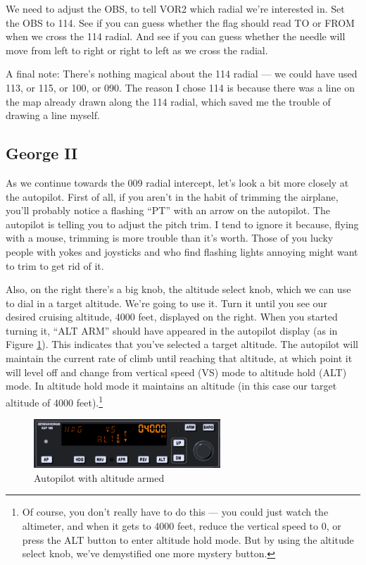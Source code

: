 We need to adjust the OBS, to tell VOR2 which radial we're interested
in.  Set the OBS to 114.  See if you can guess whether the flag should
read TO or FROM when we cross the 114 radial.  And see if you can
guess whether the needle will move from left to right or right to left
as we cross the radial.

A final note: There's nothing magical about the 114 radial --- we
could have used 113, or 115, or 100, or 090.  The reason I chose 114
is because there was a line on the map already drawn along the 114
radial, which saved me the trouble of drawing a line myself.

\subsection{George II}

As we continue towards the 009 radial intercept, let's look a bit more
closely at the autopilot.  First of all, if you aren't in the habit of
trimming the airplane, you'll probably notice a flashing ``PT'' with
an arrow on the autopilot.  The autopilot is telling you to adjust the
pitch trim.  I tend to ignore it because, flying with a mouse,
trimming is more trouble than it's worth.  Those of you lucky people
with yokes and joysticks and who find flashing lights annoying might
want to trim to get rid of it.

Also, on the right there's a big knob, the altitude select knob, which
we can use to dial in a target altitude.  We're going to use it.  Turn
it until you see our desired cruising altitude, 4000 feet, displayed
on the right.  When you started turning it, ``ALT ARM'' should have
appeared in the autopilot display (as in Figure \ref{fig:ap_alt}).
This indicates that you've selected a target altitude.  The autopilot
will maintain the current rate of climb until reaching that altitude,
at which point it will level off and change from vertical speed (VS)
mode to altitude hold (ALT) mode.  In altitude hold mode it maintains
an altitude (in this case our target altitude of 4000 feet).\footnote{
  Of course, you don't really have to do this --- you could just watch
  the altimeter, and when it gets to 4000 feet, reduce the vertical
  speed to 0, or press the ALT button to enter altitude hold mode.
  But by using the altitude select knob, we've demystified one more
  mystery button.}

\begin{figure}
  \begin{center}
    \includegraphics[width=7cm]{img/ap_alt}
    \caption{Autopilot with altitude armed}
    \label{fig:ap_alt}
  \end{center}
\end{figure}

